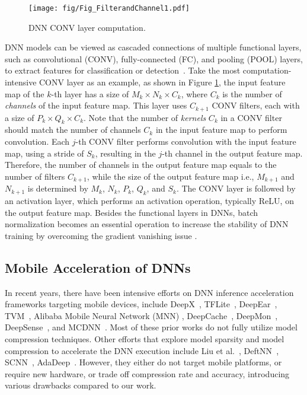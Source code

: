 \documentclass[sigplan,screen]{acmart}
\begin{document}
\begin{figure}\centering
    \texttt{[image: fig/Fig\_FilterandChannel1.pdf]}
\caption{DNN CONV layer computation.}
    \label{fig:DNNlayer}
\end{figure}

DNN models can be viewed as cascaded connections of multiple functional layers, such as convolutional (CONV), fully-connected (FC), and pooling (POOL) layers, to extract features for classification or detection~\cite{lee2009convolutional,karpathy2014large,yu2011deep}.
Take the most computation-intensive CONV layer as an example, 
as shown in Figure \ref{fig:DNNlayer}, the input feature map of the $k$-th layer has a size of $M_k \times N_k \times C_k$, where $C_k$ is the number of \emph{channels} of the input feature map.
This layer uses $C_{k+1}$ CONV filters, each with a size of $P_k \times Q_k \times C_k$. 
Note that the number of \emph{kernels} $C_k$ in a CONV filter should match the number of channels $C_k$ in the input feature map to perform convolution.
Each $j$-th CONV filter performs convolution with the input feature map, using a stride of $S_k$, resulting in the $j$-th channel in the output feature map.
Therefore, the number of channels in the output feature map equals to the number of filters $C_{k+1}$, while the size of the output feature map i.e., $M_{k+1}$ and $N_{k+1}$ is determined by $M_k$, $N_k$, $P_k$, $Q_k$, and $S_k$.
The CONV layer is followed by an activation layer, which performs an activation operation, typically ReLU, on the output feature map.
Besides the functional layers in DNNs, {batch normalization} becomes an essential operation to increase the stability of DNN training by overcoming the gradient vanishing issue \cite{ioffe2015batch}. 

\subsection{Mobile Acceleration of DNNs}


In recent years, there have been intensive efforts 
on DNN inference acceleration frameworks targeting mobile devices, include DeepX~\cite{lane2016deepx}, TFLite~\cite{TensorFlow-Lite}, DeepEar~\cite{lane2015deepear}, TVM~\cite{chen2018tvm}, Alibaba Mobile Neural Network (MNN) \cite{Ali-MNN}, DeepCache~\cite{xu2018deepcache},  DeepMon~\cite{huynh2017deepmon}, DeepSense~\cite{yao2017deepsense}, and MCDNN~\cite{han2016mcdnn}. 
Most of these prior works do not fully utilize model compression techniques.
Other efforts that explore model sparsity and model compression to accelerate the DNN execution include Liu et al.~\cite{liu2015sparse}, DeftNN~\cite{hill2017deftnn}, SCNN~\cite{parashar2017scnn}, AdaDeep~\cite{liu2018demand}. However, they either do not target mobile platforms, or require new hardware, or trade off compression rate and accuracy,
introducing various drawbacks compared to our work.
\end{document}
